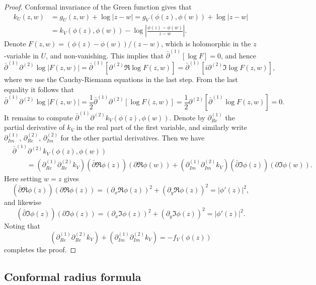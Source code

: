 \documentclass[11pt]{article}
\theoremstyle{remark}
\newcommand{\eqnsplst}[1]{\begin{equation*}\begin{split}%
   #1\end{split}\end{equation*}}
\begin{document}
\begin{proof}
Conformal invariance of the Green function \cite[Theorem X.5.3]{Conway-book-I} gives that 
\eqnsplst{ 
  k_U(z,w)
  &= g_U(z,w) + \log |z - w|
  = g_V(\phi(z),\phi(w)) + \log |z - w| \\
  &= k_V(\phi(z),\phi(w)) - \log \left| \frac{\phi(z) - \phi(w)}{z-w} \right|. }
Denote $F(z,w) = (\phi(z) - \phi(w))/(z-w)$, which is holomorphic in the $z$-variable
in $U$, and non-vanishing. This implies that $\bar{\partial}^{(1)} [ \log F ] = 0$, 
and hence
\[ \bar{\partial}^{(1)} \partial^{(2)} \log |F(z,w)|
   = \bar{\partial}^{(1)} \left[ \partial^{(2)} \Re \log F(z,w) \right] 
   = \bar{\partial}^{(1)} \left[ i \partial^{(2)} \Im \log F(z,w) \right], \]
where we use the Cauchy-Riemann equations in the last step. From the last equality 
it follows that 
\[ \bar{\partial}^{(1)} \partial^{(2)} \log |F(z,w)|
   = \frac{1}{2} \bar{\partial}^{(1)} \partial^{(2)} \left[ \log F(z,w) \right]
   = \frac{1}{2} \partial^{(2)} \left[ \bar{\partial}^{(1)} \log F(z,w) \right]
   = 0. \]
It remains to compute $\bar{\partial}^{(1)} \partial^{(2)} k_V( \phi(z), \phi(w) )$. 
Denote by $\partial^{(1)}_{Re}$ the partial derivative of $k_V$ in the real part of the 
first variable, and similarly write $\partial^{(1)}_{Im}$, $\partial^{(2)}_{Re}$, $\partial^{(2)}_{Im}$ for the other partial derivatives. Then we have
\eqnsplst{
  &\bar{\partial}^{(1)} \partial^{(2)} k_V (\phi(z), \phi(w)) \\
  &\qquad = \left( \partial^{(1)}_{Re} \partial^{(2)}_{Re} k_V \right) 
     \left( \bar{\partial} \Re \phi(z) \right) \left( \partial \Re \phi(w) \right) 
     + \left( \partial^{(1)}_{Im} \partial^{(2)}_{Im} k_V \right) 
     \left( \bar{\partial} \Im \phi(z) \right) \left( \partial \Im \phi(w) \right). }
Here setting $w = z$ gives
\[ \left( \bar{\partial} \Re \phi(z) \right) \left( \partial \Re \phi(z) \right)
   = \left( \partial_x \Re \phi(z) \right)^2 + \left( \partial_y \Re \phi(z) \right)^2
   = \left| \phi'(z) \right|^2, \]
and likewise
\[ \left( \bar{\partial} \Im \phi(z) \right) \left( \partial \Im \phi(z) \right)
   = \left( \partial_x \Im \phi(z) \right)^2 + \left( \partial_y \Im \phi(z) \right)^2
   = \left| \phi'(z) \right|^2. \]
Noting that 
\[ \left( \partial^{(1)}_{Re} \partial^{(2)}_{Re} k_V \right) 
   + \left( \partial^{(1)}_{Im} \partial^{(2)}_{Im} k_V \right) 
   = - f_V(\phi(z)) \]
completes the proof.
\end{proof}


\subsection{Conformal radius formula}
\end{document}
